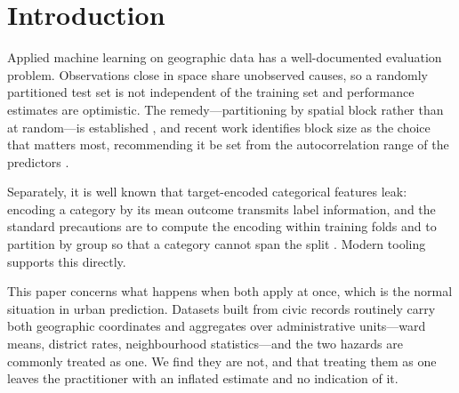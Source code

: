 \documentclass[11pt]{article}
\begin{document}
\begin{abstract}
Rebuilding the task from New York City's licence register reproduces the
leakage in direction but at roughly one fifth the magnitude, which the mechanism
predicts: that register is shallow, $98\%$ of its locations have a single
tenant, and group means with little variance have little to transmit. We report
this as a boundary condition---leakage scales with the group-level structure the
outcome carries---rather than as a confirmation. Notably, most municipal portals
publish only currently active businesses; Seattle and Los Angeles record no
closure dates at all, which is why registers deep enough for this analysis are
scarce.

The substantive finding survives honest evaluation and is, to our knowledge, new:
excess turnover concentrates at individual addresses rather than districts, with
neighbours only weakly elevated and tenancies failing roughly $1.5\times$ faster
per renewal cycle. The underlying records are public domain and the pipeline is
released in full, so every number reported here can be regenerated from the
published source.
\end{abstract}

\section{Introduction}

Applied machine learning on geographic data has a well-documented evaluation
problem. Observations close in space share unobserved causes, so a randomly
partitioned test set is not independent of the training set and performance
estimates are optimistic. The remedy---partitioning by spatial block rather than
at random---is established \citep{roberts2017,ploton2020,valavi2019}, and recent
work identifies block size as the choice that matters most, recommending it be
set from the autocorrelation range of the predictors \citep{stock2025}.

Separately, it is well known that target-encoded categorical features leak:
encoding a category by its mean outcome transmits label information, and the
standard precautions are to compute the encoding within training folds and to
partition by group so that a category cannot span the split
\citep{micci2001,prokhorenkova2018}. Modern tooling supports this directly.

This paper concerns what happens when both apply at once, which is the normal
situation in urban prediction. Datasets built from civic records routinely carry
both geographic coordinates and aggregates over administrative units---ward
means, district rates, neighbourhood statistics---and the two hazards are
commonly treated as one. We find they are not, and that treating them as one
leaves the practitioner with an inflated estimate and no indication of it.
\end{document}

